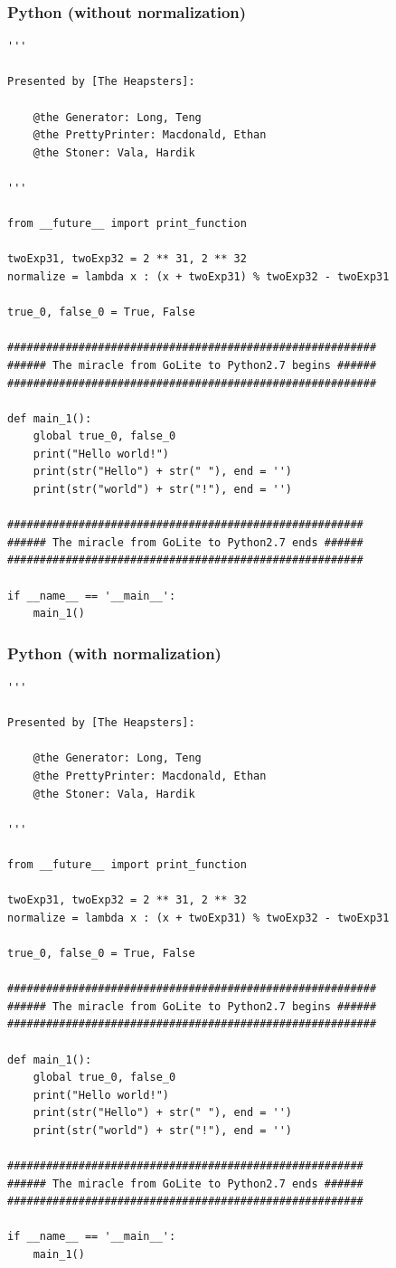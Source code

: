 \documentclass{article}
\begin{document}
\subsubsection{Python (without normalization)}
\begin{lstlisting}
'''

Presented by [The Heapsters]:

	@the Generator: Long, Teng
	@the PrettyPrinter: Macdonald, Ethan
	@the Stoner: Vala, Hardik

'''

from __future__ import print_function

twoExp31, twoExp32 = 2 ** 31, 2 ** 32
normalize = lambda x : (x + twoExp31) % twoExp32 - twoExp31

true_0, false_0 = True, False

#########################################################
###### The miracle from GoLite to Python2.7 begins ######
#########################################################

def main_1():
	global true_0, false_0
	print("Hello world!")
	print(str("Hello") + str(" "), end = '')
	print(str("world") + str("!"), end = '')

#######################################################
###### The miracle from GoLite to Python2.7 ends ######
#######################################################

if __name__ == '__main__':
	main_1()
\end{lstlisting}
\subsubsection{Python (with normalization)}
\begin{lstlisting}
'''

Presented by [The Heapsters]:

	@the Generator: Long, Teng
	@the PrettyPrinter: Macdonald, Ethan
	@the Stoner: Vala, Hardik

'''

from __future__ import print_function

twoExp31, twoExp32 = 2 ** 31, 2 ** 32
normalize = lambda x : (x + twoExp31) % twoExp32 - twoExp31

true_0, false_0 = True, False

#########################################################
###### The miracle from GoLite to Python2.7 begins ######
#########################################################

def main_1():
	global true_0, false_0
	print("Hello world!")
	print(str("Hello") + str(" "), end = '')
	print(str("world") + str("!"), end = '')

#######################################################
###### The miracle from GoLite to Python2.7 ends ######
#######################################################

if __name__ == '__main__':
	main_1()

\end{lstlisting}
\end{document}
